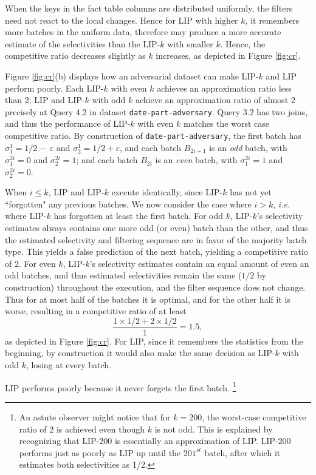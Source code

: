 When the keys in the fact table columns are distributed uniformly, the filters need not react to the local changes. Hence for LIP with higher $k$, it remembers more batches in the uniform data, therefore may produce a more accurate estimate of the selectivities than the LIP-$k$ with smaller $k$. Hence, the competitive ratio decreases slightly as $k$ increases, as depicted in Figure \ref{fig:cr}.

Figure \ref{fig:cr}(b) displays how an adversarial dataset can make LIP-$k$ and LIP perform poorly. Each LIP-$k$ with even $k$ achieves an approximation ratio less than 2; LIP and LIP-$k$ with odd $k$ achieve an approximation ratio of almost 2 precisely at Query 4.2 in dataset \texttt{date-part-adversary}. Query 3.2 has two joins, and thus the performance of LIP-$k$ with even $k$ matches the worst case competitive ratio. By construction of \texttt{date-part-adversary}, the first batch has $\sigma^{1}_{1} = 1/2-\
\varepsilon$ and $\sigma^{1}_{2} = 1/2+\varepsilon$, and  each batch $B_{2i+1}$ is an \textit{odd} batch, with $\sigma^{2i}_{1} = 0$ and $\sigma^{2i}_{2} = 1$; and each batch $B_{2i}$ is an \textit{even} batch, with $\sigma^{2i}_{1} = 1$ and $\sigma^{2i}_{2} = 0$. 

When $i \leq k$, LIP and LIP-$k$ execute identically, since LIP-$k$ has not yet ``forgotten" any previous batches. We now consider the case where $i > k$, {\it i.e.} where LIP-$k$ has forgotten at least the first batch. For odd $k$, LIP-$k$'s selectivity estimates always contains one more odd (or even) batch than the other, and thus the estimated selectivity and filtering sequence are in favor of the majority batch type. This yields a false prediction of the next batch, yielding a competitive ratio of 2. For even $k$, LIP-$k$'s selectivity estimates contain an equal amount of even an odd batches,  and thus estimated selectivities remain the same ($1/2$ by construction) throughout the execution, and the filter sequence does not change. Thus for at most half of the batches it is optimal, and for the other half it is worse, resulting in a competitive ratio of at least \[ \frac{1 \times 1/2 + 2 \times 1/2}{1} = 1.5,\] as depicted in Figure \ref{fig:cr}. For LIP, since it remembers the statistics from the beginning, by construction it would also make the same decision as LIP-$k$ with odd $k$, losing at every batch. 

LIP performs poorly because it never forgets the first batch.
\footnote{An astute observer might notice that for $k = 200$, the worst-case competitive ratio of $2$ is achieved even though $k$ is not odd. This is explained by recognizing that LIP-200 is essentially an approximation of LIP. LIP-200 performs just as poorly as LIP up until  the $201^{st}$ batch, after which it estimates both selectivities as 1/2.}



